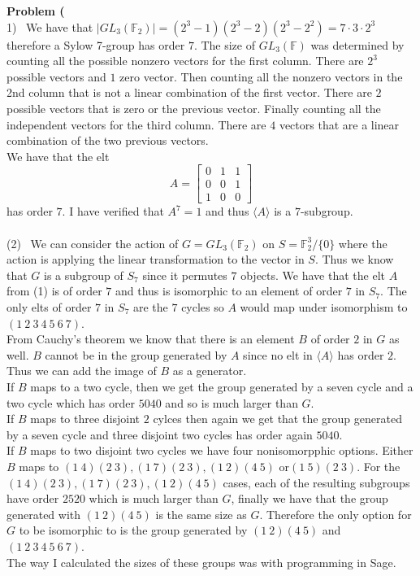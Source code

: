 \documentclass[12pt]{article}
\newenvironment{ques}[1]{\textbf{Problem #1}\vspace{1 mm}\\ }{\bigskip}
\theoremstyle{definition}
\newcommand{\F}{\mathbb F}
\begin{document}
\begin{ques}{1.5}
	(1) \ We have that $|GL_3(\F_2)| = (2^3 - 1)(2^3 - 2)(2^3-2^2)= 7 \cdot 3 
	\cdot 2^3$ therefore a Sylow 7-group has order $7$. The size of $GL_3(\F)$
	was determined by counting all the possible nonzero vectors for the first
	column. There are $2^3$ possible vectors and $1$ zero vector. Then counting
	all the nonzero vectors in the 2nd column that is not
	a linear combination of the first vector. There are $2$ possible vectors
	that is zero or the previous vector. Finally counting all the independent
	vectors for the third column. There are $4$ vectors that are a linear
	combination of the two previous vectors.\\
	We have that the elt
	$$A = \begin{bmatrix}
		0 & 1 & 1 \\
		0 & 0 & 1 \\
		1 & 0 & 0
	\end{bmatrix}$$
	has order $7$. I have verified that $A^7 = 1$ and thus $\langle A \rangle$
	is a $7$-subgroup.\\
\\
	(2) \ We can consider the action of $G = GL_3(\F_2)$ on $S = \F_2^3/\{0\}$
	where the action is applying the linear transformation to the vector in
	$S$. Thus we know that $G$ is a subgroup of $S_7$ since it permutes $7$
	objects. We have that the elt $A$ from (1) is of order $7$ and thus is
	isomorphic to an element of order $7$ in $S_7$. The only elts of order $7$
	in $S_7$ are the $7$ cycles so $A$ would map under isomorphism to $(1\ 2\
	3\ 4\ 5\ 6\ 7)$.\\
	From Cauchy's theorem we know that there is an element $B$ of order $2$ in
	$G$ as well. $B$ cannot be in the group generated by $A$ since no elt in
	$\langle A \rangle$ has order $2$. Thus we can add the image of $B$ as a
	generator. \\
	If $B$ maps to a two cycle, then we get the group generated by a
	seven cycle and a two cycle which has order $5040$ and so is much larger than
	$G$. \\
	If $B$ maps to three disjoint $2$ cylces then again we get that the
	group generated by a seven cycle and three disjoint two cycles has order
	again $5040$. \\
	If $B$ maps to two disjoint two cycles we
	have four nonisomorpphic options. Either $B$ maps to $(1 \ 4)(2 \ 3), (1 \
	7)(2 \ 3), (1 \ 2)(4 \ 5)$ or$(1 \ 5)(2 \ 3)$. For the $(1 \ 4)(2 \ 3), (1
	\ 7)(2 \ 3), (1 \ 2)(4 \ 5)$ cases, each of the resulting subgroups have
	order $2520$ which is much larger than $G$, finally we have that the group
	generated with $(1 \ 2)(4 \ 5)$ is the same size as $G$. Therefore the only
	option for $G$ to be isomorphic to is the group generated by $(1 \ 2)(4 \
	5)$ and $(1\ 2\ 3\ 4\ 5\ 6\ 7)$. \\
	The way I calculated the sizes of these groups was with programming in Sage.
\end{ques}
\end{document}
